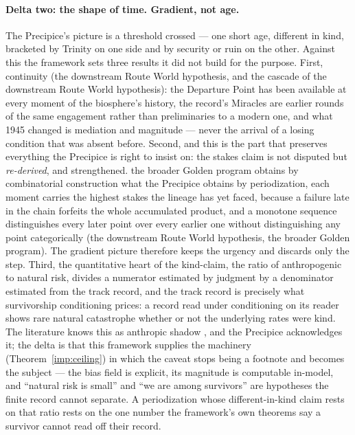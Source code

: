 \paragraph{Delta two: the shape of time. Gradient, not age.} The
Precipice's picture is a threshold crossed --- one short age, different
in kind, bracketed by Trinity on one side and by security or ruin on
the other. Against this the framework sets three results it did not
build for the purpose. First, continuity
(the downstream Route World hypothesis, and the cascade of
the downstream Route World hypothesis): the Departure Point has been available at
every moment of the biosphere's history, the record's Miracles are
earlier rounds of the same engagement rather than preliminaries to a
modern one, and what 1945 changed is mediation and magnitude ---
never the arrival of a losing condition that was absent before.
Second, and this is the part that preserves everything the Precipice
is right to insist on: the stakes claim is not disputed but
\emph{re-derived}, and strengthened. the broader Golden program
obtains by combinatorial construction what the Precipice obtains by
periodization, each moment carries the highest stakes the lineage
has yet faced, because a failure late in the chain forfeits the whole
accumulated product, and a monotone sequence distinguishes every
later point over every earlier one without distinguishing any point
categorically (the downstream Route World hypothesis,
the broader Golden program). The gradient picture therefore keeps
the urgency and discards only the step. Third, the quantitative heart
of the kind-claim, the ratio of anthropogenic to natural risk, divides a numerator estimated by judgment by a denominator estimated
from the track record, and the track record is precisely what
survivorship conditioning prices: a record read under conditioning on
its reader shows rare natural catastrophe whether or not the
underlying rates were kind. The literature knows this as anthropic
shadow \cite{CSB10}, and the Precipice acknowledges it; the delta is
that this framework supplies the machinery
(Theorem~\ref{imp:ceiling}) in which the caveat stops being a footnote and
becomes the subject --- the bias field is explicit, its magnitude is
computable in-model, and ``natural risk is small'' and ``we are among
survivors'' are hypotheses the finite record cannot separate. A
periodization whose different-in-kind claim rests on that ratio rests
on the one number the framework's own theorems say a survivor cannot
read off their record.


